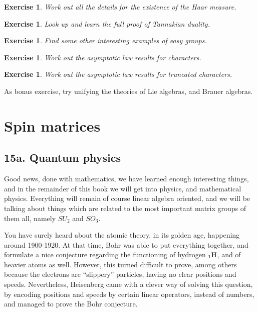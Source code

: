 \documentclass[12pt]{amsbook}
\newtheorem{exercise}[theorem]{Exercise}
\begin{document}
\begin{exercise}
Work out all the details for the existence of the Haar measure.
\end{exercise}

\begin{exercise}
Look up and learn the full proof of Tannakian duality.
\end{exercise}

\begin{exercise}
Find some other interesting examples of easy groups.
\end{exercise}

\begin{exercise}
Work out the asymptotic law results for characters.
\end{exercise}

\begin{exercise}
Work out the asymptotic law results for truncated characters.
\end{exercise}

As bonus exercise, try unifying the theories of Lie algebras, and Brauer algebras.

\chapter{Spin matrices}

\section*{15a. Quantum physics}

Good news, done with mathematics, we have learned enough interesting things, and in the remainder of this book we will get into physics, and mathematical physics. Everything will remain of course linear algebra oriented, and we will be talking about things which are related to the most important matrix groups of them all, namely $SU_2$ and $SO_3$.

\bigskip

You have surely heard about the atomic theory, in its golden age, happening around 1900-1920. At that time, Bohr was able to put everything together, and formulate a nice conjecture regarding the functioning of hydrogen $_1{\rm H}$, and of heavier atoms as well. However, this turned difficult to prove, among others because the electrons are ``slippery'' particles, having no clear positions and speeds. Nevertheless, Heisenberg came with a clever way of solving this question, by encoding positions and speeds by certain linear operators, instead of numbers, and managed to prove the Bohr conjecture.
\end{document}
